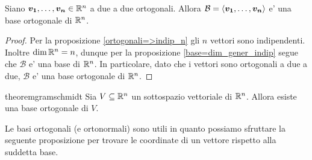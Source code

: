 \begin{proposition}
    Siano $\bm{v_1}, \dots, \bm{v_n} \in \mathbb{R}^n$ a due a due ortogonali. Allora $\mathcal{B} = \left\langle \bm{v_1}, \dots, \bm{v_n} \right\rangle$ e' una base ortogonale di $\mathbb{R}^n$.
\end{proposition}
\begin{proof}
    Per la proposizione \ref{ortogonali=>indip_n} gli $n$ vettori sono indipendenti. Inoltre $\dim \mathbb{R}^n = n$, dunque per la proposizione \ref{base=dim_gener_indip} segue che $\mathcal{B}$ e' una base di $\mathbb{R}^n$. In particolare, dato che i vettori sono ortogonali a due a due, $\mathcal{B}$ e' una base ortogonale di $\mathbb{R}^n$.
\end{proof}

\begin{restatable}{theorem}{gramschmidt}
    Sia $V \subseteq \mathbb{R}^n$ un sottospazio vettoriale di $\mathbb{R}^n$. Allora esiste una base ortogonale di $V$.
\end{restatable}

Le basi ortogonali (e ortonormali) sono utili in quanto possiamo sfruttare la seguente proposizione per trovare le coordinate di un vettore rispetto alla suddetta base.

